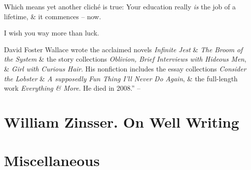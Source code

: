 \documentclass{article}
\begin{document}
Which means yet another clich\'e is true: Your education really {\it is} the job of a lifetime, \& it commences -- now.

I wish you way more than luck.

{\sc David Foster Wallace} wrote the acclaimed novels {\it Infinite Jest} \& {\it The Broom of the System} \& the story collections {\it Oblivion, Brief Interviews with Hideous Men}, \& {\it Girl with Curious Hair}. His nonfiction includes the essay collections {\it Consider the Lobster} \& {\it A supposedly Fun Thing I'll Never Do  Again}, \& the full-length work {\it Everything \& More}. He died in 2008.'' -- \cite{Wallace_water}




\section{{\sc William Zinsser}. On Well Writing}






\section{Miscellaneous}


\printbibliography[heading=bibintoc]
	
\end{document}
